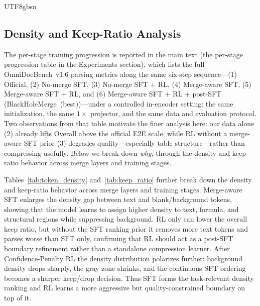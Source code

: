 \documentclass[10pt,twocolumn,letterpaper]{article}
\newcommand{\ours}{BlackHoleMerge}
\begin{document}
\begin{CJK}{UTF8}{gbsn}
\subsection{Density and Keep-Ratio Analysis}
The per-stage training progression is reported in the main text (the per-stage progression
table in the Experiments section), which lists the full OmniDocBench~v1.6 parsing metrics
along the same six-step sequence---(1) Official, (2) No-merge SFT, (3) No-merge SFT + RL,
(4) Merge-aware SFT, (5) Merge-aware SFT + RL, and (6) Merge-aware SFT + RL + post-SFT
(\ours{}~(best))---under a controlled in-encoder setting: the same initialization, the same
$1\times$ projector, and the same data and evaluation protocol. Two observations from that
table motivate the finer analysis here: our data alone (2) already lifts Overall above the
official E2E scale, while RL without a merge-aware SFT prior (3) degrades quality---especially
table structure---rather than compressing usefully. Below we
break down \emph{why}, through the density and keep-ratio behavior across merge layers and
training stages.

Tables~\ref{tab:token_density} and~\ref{tab:keep_ratio} further break down the density and
keep-ratio behavior across merge layers and training stages. Merge-aware SFT enlarges the
density gap between text and blank/background tokens, showing that the model learns to assign
higher density to text, formula, and structural regions while suppressing background. RL only
can lower the overall keep ratio, but without the SFT ranking prior it removes more text
tokens and parses worse than SFT only, confirming that RL should act as a post-SFT boundary
refinement rather than a standalone compression learner. After Confidence-Penalty RL the
density distribution polarizes further: background density drops sharply, the gray zone
shrinks, and the continuous SFT ordering becomes a sharper keep/drop decision. Thus SFT forms
the task-relevant density ranking and RL learns a more aggressive but quality-constrained
boundary on top of it.


\end{CJK}
\end{document}
